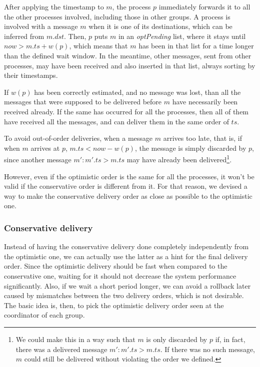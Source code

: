 \documentclass[times, 10pt]{article}
\begin{document}
After applying the timestamp to $m$, the process $p$ immediately forwards it to all the other processes involved, including those in other groups. A process is involved with a message $m$ when it is one of its destinations, which can be inferred from $m.dst$. Then, $p$ puts $m$ in an \mbox{\textit{optPending}} list, where it stays until $now>m.ts+w(p)$, which means that $m$ has been in that list for a time longer than the defined wait window. In the meantime, other messages, sent from other processes, may have been received and also inserted in that list, always sorting by their timestamps.

If $w(p)$ has been correctly estimated, and no message was lost, than all the messages that were supposed to be delivered before $m$ have necessarily been received already. If the same has occurred for all the processes, then all of them have received all the messages, and can deliver them in the same order of $ts$.

To avoid out-of-order deliveries, when a message $m$ arrives too late, that is, if when $m$ arrives at $p$, $m.ts < now - w(p)$, the message is simply discarded by $p$, since another message $m' : m'.ts > m.ts$ may have already been delivered\footnote{We could make this in a way such that $m$ is only discarded by $p$ if, in fact, there was a delivered message $m' : m'.ts > m.ts$. If there was no such message, $m$ could still be delivered without violating the order we defined.}.

However, even if the optimistic order is the same for all the processes, it won't be valid if the conservative order is different from it. For that reason, we devised a way to make the conservative delivery order as close as possible to the optimistic one.

\subsubsection{Conservative delivery}

Instead of having the conservative delivery done completely independently from the optimistic one, we can actually use the latter as a hint for the final delivery order. Since the optimistic delivery should be fast when compared to the conservative one, waiting for it should not decrease the system performance significantly. Also, if we wait a short period longer, we can avoid a rollback later caused by mismatches between the two delivery orders, which is not desirable. The basic idea is, then, to pick the optimistic delivery order seen at the coordinator of each group.
\end{document}
